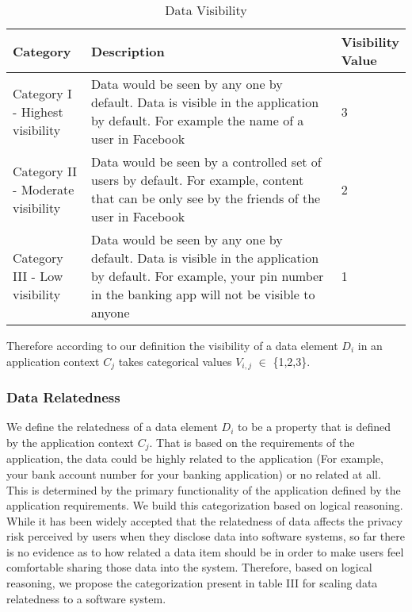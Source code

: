 \documentclass[10pt]{article}
\begin{document}
\begin{center}
\begin{table}[htbp]
\caption{Data Visibility}
\begin{center}
\begin{adjustbox}{width=0.5\textwidth} 
\begin{tabular}{|p{0.2\linewidth}|p{0.7\linewidth}|p{0.1\linewidth}|} 
\hline
Category & Description & Visibility Value \\
\hline
Category I - Highest visibility & Data would be seen by any one by default. Data is visible in the application by default. For example the name of a user in Facebook & 3 \\
\hline
Category II - Moderate visibility & Data would be seen by a controlled set of users by default. For example, content that can be only see by the friends of the user in Facebook & 2 \\
\hline
Category III - Low visibility & Data would be seen by any one by default. Data is visible in the application by default. For example, your pin number in the banking app will not be visible to anyone & 1 \\
\hline
\end{tabular}
\end{adjustbox}
\end{center}
\end{table}
\end{center} 

Therefore according to our definition the visibility of a data element \textit {$D_i$} in an application context \textit {$C_j$} takes categorical values \textit {$V_{i,j}$} $\in$ \{1,2,3\}.

\subsubsection {Data Relatedness} We define the relatedness of a data element \textit {$D_i$} to be a property that is defined by the application context \textit {$C_j$}. That is based on the requirements of the application, the data could be highly related to the application (For example, your bank account number for your banking application) or no related at all. This is determined by the primary functionality of the application defined by the application requirements. We build this categorization based on logical reasoning. While it has been widely accepted that the relatedness of data affects the privacy risk perceived by users when they disclose data into software systems, so far there is no evidence as to how related a data item should be in order to make users feel comfortable sharing those data into the system. Therefore, based on logical reasoning, we propose the categorization present in table III for scaling data relatedness to a software system. 
\end{document}
